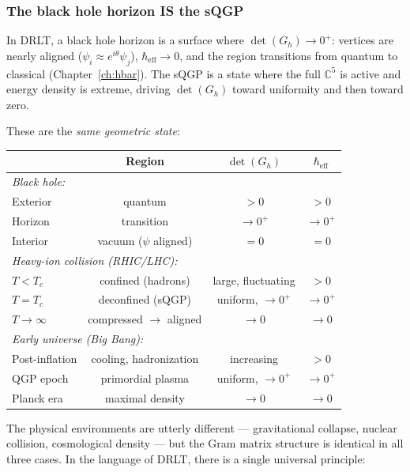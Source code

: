 \documentclass[12pt]{article}
\theoremstyle{remark}
\theoremstyle{definition}
\begin{document}
\subsubsection{The black hole horizon IS the sQGP}

In DRLT, a black hole horizon is a surface where $\det(G_h) \to 0^+$: vertices are nearly aligned ($\psi_i \approx e^{i\theta}\psi_j$), $\hbar_\text{eff} \to 0$, and the region transitions from quantum to classical (Chapter~\ref{ch:hbar}). The sQGP is a state where the full $\mathbb{C}^5$ is active and energy density is extreme, driving $\det(G_h)$ toward uniformity and then toward zero.

These are the \emph{same geometric state}:

\begin{center}
\begin{tabular}{lccc}
\hline
& Region & $\det(G_h)$ & $\hbar_\text{eff}$ \\
\hline
\multicolumn{4}{l}{\emph{Black hole:}} \\
\quad Exterior & quantum & $> 0$ & $> 0$ \\
\quad Horizon & transition & $\to 0^+$ & $\to 0^+$ \\
\quad Interior & vacuum ($\psi$ aligned) & $= 0$ & $= 0$ \\
\hline
\multicolumn{4}{l}{\emph{Heavy-ion collision (RHIC/LHC):}} \\
\quad $T < T_c$ & confined (hadrons) & large, fluctuating & $> 0$ \\
\quad $T = T_c$ & deconfined (sQGP) & uniform, $\to 0^+$ & $\to 0^+$ \\
\quad $T \to \infty$ & compressed $\to$ aligned & $\to 0$ & $\to 0$ \\
\hline
\multicolumn{4}{l}{\emph{Early universe (Big Bang):}} \\
\quad Post-inflation & cooling, hadronization & increasing & $> 0$ \\
\quad QGP epoch & primordial plasma & uniform, $\to 0^+$ & $\to 0^+$ \\
\quad Planck era & maximal density & $\to 0$ & $\to 0$ \\
\hline
\end{tabular}
\end{center}

The physical environments are utterly different --- gravitational collapse, nuclear collision, cosmological density --- but the Gram matrix structure is identical in all three cases. In the language of DRLT, there is a single universal principle:
\end{document}
